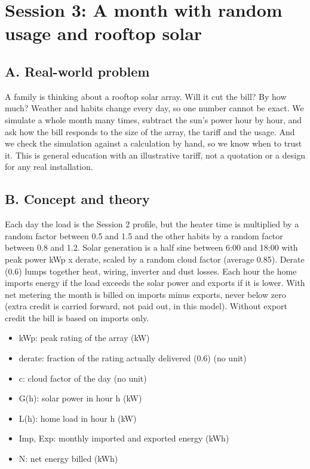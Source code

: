 \documentclass[11pt,a4paper]{article}
\begin{document}
\section{Session 3: A month with random usage and rooftop solar}

\subsection*{A. Real-world problem}
A family is thinking about a rooftop solar array. Will it cut the bill? By how much? Weather and habits change every day, so one number cannot be exact. We simulate a whole month many times, subtract the sun's power hour by hour, and ask how the bill responds to the size of the array, the tariff and the usage. And we check the simulation against a calculation by hand, so we know when to trust it. This is general education with an illustrative tariff, not a quotation or a design for any real installation.

\subsection*{B. Concept and theory}
Each day the load is the Session 2 profile, but the heater time is multiplied by a random factor between 0.5 and 1.5 and the other habits by a random factor between 0.8 and 1.2. Solar generation is a half sine between 6:00 and 18:00 with peak power kWp x derate, scaled by a random cloud factor (average 0.85). Derate (0.6) lumps together heat, wiring, inverter and dust losses. Each hour the home imports energy if the load exceeds the solar power and exports if it is lower. With net metering the month is billed on imports minus exports, never below zero (extra credit is carried forward, not paid out, in this model). Without export credit the bill is based on imports only.

\begin{itemize}[nosep]
\item kWp: peak rating of the array (kW)
\item derate: fraction of the rating actually delivered (0.6) (no unit)
\item c: cloud factor of the day (no unit)
\item G(h): solar power in hour h (kW)
\item L(h): home load in hour h (kW)
\item Imp, Exp: monthly imported and exported energy (kWh)
\item N: net energy billed (kWh)
\end{itemize}
\end{document}
